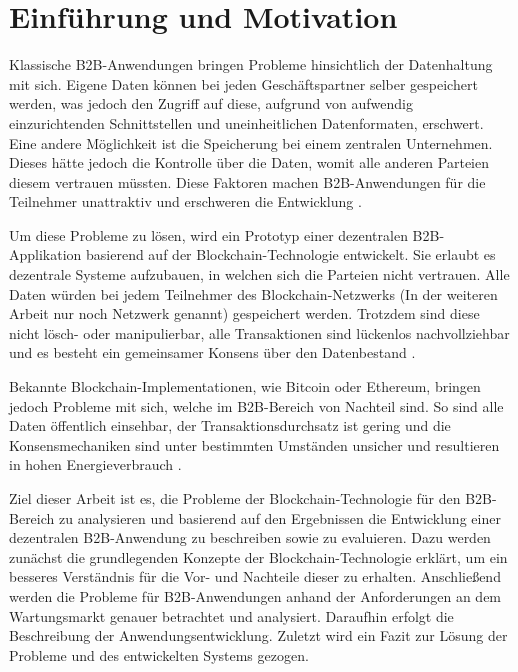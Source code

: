 \chapter{Einführung und Motivation}
\label{cha:einfuehrung}

Klassische B2B-Anwendungen bringen Probleme hinsichtlich der Datenhaltung mit sich. Eigene Daten können bei jeden Geschäftspartner selber gespeichert werden, was jedoch den Zugriff auf diese, aufgrund von aufwendig einzurichtenden Schnittstellen und uneinheitlichen Datenformaten, erschwert. Eine andere Möglichkeit ist die Speicherung bei einem zentralen Unternehmen. Dieses hätte jedoch die Kontrolle über die Daten, womit alle anderen Parteien diesem vertrauen müssten. Diese Faktoren machen B2B-Anwendungen für die Teilnehmer unattraktiv und erschweren die Entwicklung \cite{KorpelaDigitalSupplyChain2017} \cite{WustyouneedBlockchain2017}.

Um diese Probleme zu lösen, wird ein Prototyp einer dezentralen B2B-Applikation basierend auf der Blockchain-Technologie entwickelt. Sie erlaubt es dezentrale Systeme aufzubauen, in welchen sich die Parteien nicht vertrauen. Alle Daten würden bei jedem Teilnehmer des Blockchain-Netzwerks (In der weiteren Arbeit nur noch Netzwerk genannt) gespeichert werden. Trotzdem sind diese nicht lösch- oder manipulierbar, alle Transaktionen sind lückenlos nachvollziehbar und es besteht ein gemeinsamer Konsens über den Datenbestand \cite{CrosbyBlockChainTechnologyBitcoin2016}.

Bekannte Blockchain-Implementationen, wie Bitcoin oder Ethereum, bringen jedoch Probleme mit sich, welche im B2B-Bereich von Nachteil sind. So sind alle Daten öffentlich einsehbar, der Transaktionsdurchsatz ist gering und die Konsensmechaniken sind unter bestimmten Umständen unsicher und resultieren in hohen Energieverbrauch \cite{AntonopoulosMasteringbitcoin2015}\cite{NakamotoBitcoinPeertoPeerElectronic2008}\cite{EthereumTeamEthereumWhitePaper2017}. 

Ziel dieser Arbeit ist es, die Probleme der Blockchain-Technologie für den B2B-Bereich zu analysieren und basierend auf den Ergebnissen die Entwicklung einer dezentralen B2B-Anwendung zu beschreiben sowie zu evaluieren. Dazu werden zunächst die grundlegenden Konzepte der Blockchain-Technologie erklärt, um ein besseres Verständnis für die Vor- und Nachteile dieser zu erhalten. Anschließend werden die Probleme für B2B-Anwendungen anhand der Anforderungen an dem Wartungsmarkt genauer betrachtet und analysiert. Daraufhin erfolgt die Beschreibung der Anwendungsentwicklung. Zuletzt wird ein Fazit zur Lösung der Probleme und des entwickelten Systems gezogen.
